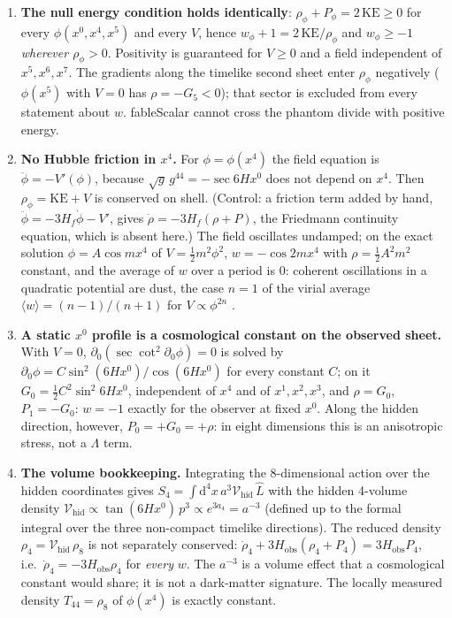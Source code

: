 \documentclass[11pt,a4paper]{article}
\newcommand{\fableScalar}{\textsf{fableScalar}}
\newcommand{\Lhat}{\hat{L}}
\newcommand{\sgn}{\sqrt{g}}
\newcommand{\dd}{\mathrm{d}}
\newcommand{\Hobs}{H_{\mathrm{obs}}}
\newcommand{\Vhid}{\mathcal{V}_{\mathrm{hid}}}
\begin{document}
\begin{enumerate}[label=(S\arabic*)]
\item \textbf{The null energy condition holds identically}: $\rho_\phi+P_\phi=2\,\mathrm{KE}\ge0$
  for every $\phi(x^0,x^4,x^5)$ and every $V$, hence $w_\phi+1=2\,\mathrm{KE}/\rho_\phi$ and
  $w_\phi\ge-1$ \emph{wherever $\rho_\phi>0$}. Positivity is guaranteed for $V\ge0$ and a field
  independent of $x^5,x^6,x^7$. The gradients along the timelike second sheet enter $\rho_\phi$
  negatively ($\phi(x^5)$ with $V=0$ has $\rho=-G_5<0$); that sector is excluded from every
  statement about $w$. \fableScalar{} cannot cross the phantom divide with positive energy.
\item \textbf{No Hubble friction in $x^4$.} For $\phi=\phi(x^4)$ the field equation is
  $\ddot\phi=-V'(\phi)$, because $\sgn\,g^{44}=-\sec 6Hx^0$ does not depend on $x^4$. Then
  $\rho_\phi=\mathrm{KE}+V$ is conserved on shell. (Control: a friction term added by hand,
  $\ddot\phi=-3H_f\dot\phi-V'$, gives $\dot\rho=-3H_f(\rho+P)$, the Friedmann continuity
  equation, which is absent here.) The field oscillates undamped; on the exact solution
  $\phi=A\cos mx^4$ of $V=\tfrac12m^2\phi^2$, $w=-\cos 2mx^4$ with $\rho=\tfrac12A^2m^2$
  constant, and the average of $w$ over a period is $0$: coherent oscillations in a quadratic
  potential are dust, the case $n=1$ of the virial average
  $\langle w\rangle=(n-1)/(n+1)$ for $V\propto\phi^{2n}$ \cite{Turner1983}.
\item \textbf{A static $x^0$ profile is a cosmological constant on the observed sheet.} With
  $V=0$, $\partial_0(\sec\cot^2\partial_0\phi)=0$ is solved by
  $\partial_0\phi=C\sin^2(6Hx^0)/\cos(6Hx^0)$ for every constant $C$; on it
  $G_0=\tfrac12C^2\sin^2 6Hx^0$, independent of $x^4$ and of $x^1,x^2,x^3$, and $\rho=G_0$,
  $P_1=-G_0$: $w=-1$ exactly for the observer at fixed $x^0$. Along the hidden direction,
  however, $P_0=+G_0=+\rho$: in eight dimensions this is an anisotropic stress, not a $\Lambda$
  term.
\item \textbf{The volume bookkeeping.} Integrating the 8-dimensional action over the hidden
  coordinates gives $S_4=\int\dd^4x\,a^3\Vhid\,\Lhat$ with the hidden 4-volume density
  $\Vhid\propto\tan(6Hx^0)\,p^3\propto e^{3a_4}=a^{-3}$ (defined up to the formal integral over
  the three non-compact timelike directions). The reduced density $\rho_4=\Vhid\,\rho_8$ is not
  separately conserved: $\dot\rho_4+3\Hobs(\rho_4+P_4)=3\Hobs P_4$, i.e.\
  $\dot\rho_4=-3\Hobs\rho_4$ for \emph{every} $w$. The $a^{-3}$ is a volume effect that a
  cosmological constant would share; it is not a dark-matter signature. The locally measured
  density $T_{44}=\rho_8$ of $\phi(x^4)$ is exactly constant.
\end{enumerate}
\end{document}
